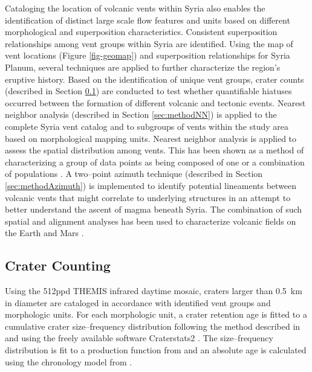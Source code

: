 \documentclass[preprint,review,authoryear,12pt]{elsarticle}
\begin{document}
Cataloging the location of volcanic vents within Syria also enables the identification of distinct large scale flow features and units based on different morphological and superposition characteristics.  Consistent superposition relationships among vent groups within Syria are identified. Using the map of vent locations (Figure \ref{fig-geomap}) and superposition relationships for Syria Planum, several techniques are applied to further characterize the region's eruptive history. Based on the identification of unique vent groups, crater counts (described in Section \ref{sec:methodCrater}) are conducted to test whether quantifiable hiatuses occurred between the formation of different volcanic and tectonic events. Nearest neighbor analysis (described in Section \ref{sec:methodNN}) is applied to the complete Syria vent catalog and to subgroups of vents within the study area based on morphological mapping units. Nearest neighbor analysis is applied to assess the spatial distribution among vents. This has been shown as a method of characterizing a group of data points as being composed of one or a combination of populations \citep{Bishop2007, Baloga2007}. A two--point azimuth technique (described in Section \ref{sec:methodAzimuth}) is implemented to identify potential lineaments between volcanic vents that might correlate to underlying structures \citep{Lutz1986,Wadge1988,Wadge1989,Connor1990,Lutz1995,Bleacher2009} in an attempt to better understand the ascent of magma beneath Syria. The combination of such spatial and alignment analyses has been used to characterize volcanic fields on the Earth \citep{Lutz1986,Lutz1995,Cebria2011,Roberts2011} and Mars \citep{Bleacher2009}.

\subsection{Crater Counting}
\label{sec:methodCrater}

Using the 512ppd THEMIS infrared daytime mosaic, craters larger than 0.5~km in diameter are cataloged in accordance with identified vent groups and morphologic units. For each morphologic unit, a crater retention age is fitted to a cumulative crater size--frequency distribution following the method described in \citet{Hartmann2005} and using the freely available software Craterstats2 \citep{Michael2010}. The size--frequency distribution is fit to a production function from \citet{Ivanov2001} and an absolute age is calculated using the chronology model from \citet{Hartmann2001}.
\end{document}
